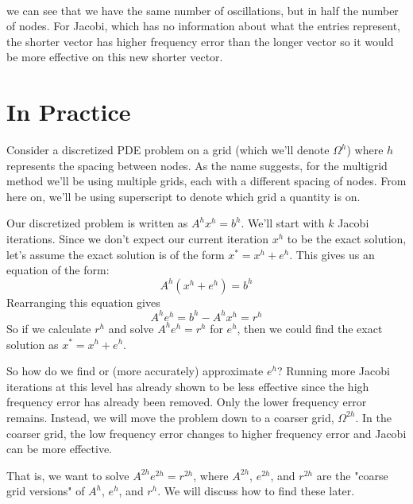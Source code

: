 \documentclass[11pt]{article}
\begin{document}
    \begin{center}
    \end{center}
    { \hspace*{\fill} \\}
    
    we can see that we have the same number of oscillations, but in half the
number of nodes. For Jacobi, which has no information about what the entries
represent, the shorter vector has higher frequency error than the longer
vector so it would be more effective on this new shorter vector.

    \hypertarget{in-practice}{%
\section{In Practice}\label{in-practice}}

Consider a discretized PDE problem on a grid (which we'll denote
\(\Omega^h\)) where \(h\) represents the spacing between nodes. As the
name suggests, for the multigrid method we'll be using multiple grids,
each with a different spacing of nodes. From here on, we'll be using
superscript to denote which grid a quantity is on.

Our discretized problem is written as \(A^h x^h = b^h\). We'll start
with \(k\) Jacobi iterations. Since we don't expect our current
iteration \(x^h\) to be the exact solution, let's assume the exact
solution is of the form \(x^* = x^h + e^h\). This gives us an equation
of the form: \begin{equation*}
A^h(x^h + e^h) = b^h
\end{equation*} Rearranging this equation gives \begin{equation*}
A^h e^h = b^h - A^hx^h = r^h
\end{equation*} So if we calculate \(r^h\) and solve \(A^h e^h = r^h\)
for \(e^h\), then we could find the exact solution as
\(x^* = x^h + e^h\).

So how do we find or (more accurately) approximate \(e^h\)? Running more
Jacobi iterations at this level has already shown to be less effective
since the high frequency error has already been removed. Only the lower
frequency error remains. Instead, we will move the problem down to a
coarser grid, \(\Omega^{2h}\). In the coarser grid, the low frequency
error changes to higher frequency error and Jacobi can be more
effective.

That is, we want to solve \(A^{2h}e^{2h} = r^{2h}\), where \(A^{2h}\),
\(e^{2h}\), and \(r^{2h}\) are the "coarse grid versions" of \(A^h\),
\(e^h\), and \(r^h\). We will discuss how to find these later.
\end{document}
